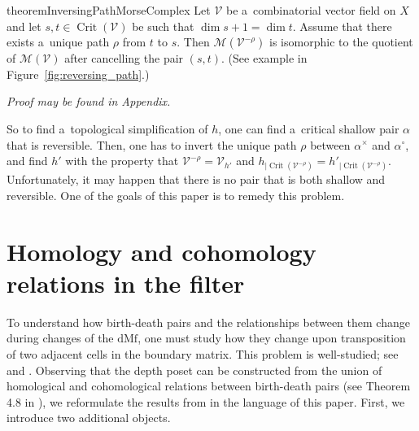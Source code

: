 \documentclass[a4paper,12pt, USenglish,cleveref,autoref,thm-restate]{article}
\newtheorem{definition}[theorem]{Definition}
\newcommand{\proofappendix}{\textit{\small Proof may be found in Appendix.}}
\newcommand{\mf}{h}
\newcommand{\omf}{h'}
\DeclareMathOperator{\bd}{BD}
\newcommand{\dmf}{\text{dMf}}
\newcommand{\hmB}{D}
\newcommand{\cmB}{D^{\perp}}
\newcommand{\bth}[1]{#1^\circ}
\newcommand{\dth}[1]{#1^{\!\times}}
\newcommand{\rel}{\rightarrow}
\newcommand{\bds}{\alpha}
\newcommand{\bdt}{\beta}
\newcommand{\bdb}{\gamma}
\newcommand{\cV}{\mathcal{V}}
\newcommand{\cM}{\mathcal{M}}
\DeclareMathOperator{\crit}{Crit}
\begin{document}
\begin{restatable}{theorem}{InversingPathMorseComplex}\label{thm:cancelation_is_path_reversing}
    Let $\cV$ be a~combinatorial vector field on $X$ and let $s, t \in \crit(\cV)$
    be such that $\dim s + 1 = \dim t$.
    Assume that there exists a~unique path $\rho$ from $t$ to $s$. Then $\cM(\cV^{-\rho})$ is isomorphic to the quotient of $\cM(\cV)$ after cancelling the pair $(s, t)$.
    (See example in Figure~\ref{fig:reversing_path}.) 
\end{restatable}

\proofappendix


\noindent So to find a~topological simplification of $\mf$, one can find a~critical shallow pair $\bds$ that is reversible. Then, one has to invert the unique path $\rho$ between $\dth\bds$ and $\bth\bds$, and find $\omf$ with the property that $\cV^{-\rho} = \cV_{\omf}$ and $
\mf_{|\crit(\cV^{-\rho})} = \omf_{|\crit(\cV^{-\rho})}$. Unfortunately, it may happen that there is no pair that is both shallow and reversible. One of the goals of this paper is to remedy this problem.



\section{Homology and cohomology relations in the filter}\label{sec:homo_and_cohomo}
    To understand how birth-death pairs and the relationships between them change during changes of the $\dmf$, one must study how they change upon transposition of two adjacent cells in the boundary matrix. This problem is well-studied; see \cite{Vineyards} and \cite{TransDepth}. Observing that the depth poset can be constructed from the union of homological and cohomological relations between birth-death pairs (see Theorem 4.8 in \cite{EdLiMrSo2024}), we reformulate the results from \cite{TransDepth} in the language of this paper. First, we introduce two additional objects.












\end{document}
